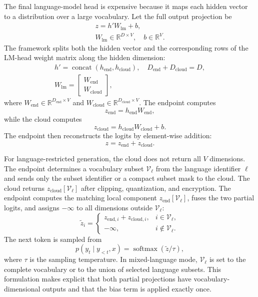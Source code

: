 \documentclass{article}
\newcommand{\End}{\mathrm{end}}
\newcommand{\Cloud}{\mathrm{cloud}}
\newcommand{\softmax}{\operatorname{softmax}}
\newcommand{\concat}{\operatorname{concat}}
\begin{document}
The final language-model head is expensive because it maps each hidden vector to a distribution over a large vocabulary. Let the full output projection be
\begin{equation}
\begin{gathered}
  z = h' W_{\mathrm{lm}} + b, \\
  W_{\mathrm{lm}} \in \mathbb{R}^{D \times V},\quad b \in \mathbb{R}^{V}.
\end{gathered}
\end{equation}
The framework splits both the hidden vector and the corresponding rows of the LM-head weight matrix along the hidden dimension:
\begin{equation}
\begin{gathered}
  h' = \concat(h_{\End}, h_{\Cloud}),\quad D_{\End}+D_{\Cloud}=D, \\
  W_{\mathrm{lm}} =
  \begin{bmatrix}
    W_{\End} \\
    W_{\Cloud}
  \end{bmatrix},
\end{gathered}
\end{equation}
where $W_{\End}\in\mathbb{R}^{D_{\End}\times V}$ and $W_{\Cloud}\in\mathbb{R}^{D_{\Cloud}\times V}$. The endpoint computes
\begin{equation}
  z_{\End}=h_{\End} W_{\End},
\end{equation}
while the cloud computes
\begin{equation}
  z_{\Cloud}=h_{\Cloud} W_{\Cloud} + b.
\end{equation}
The endpoint then reconstructs the logits by element-wise addition:
\begin{equation}
  z=z_{\End}+z_{\Cloud}.
\end{equation}

For language-restricted generation, the cloud does not return all $V$ dimensions. The endpoint determines a vocabulary subset $\mathcal{V}_{\ell}$ from the language identifier $\ell$ and sends only the subset identifier or a compact subset mask to the cloud. The cloud returns $z_{\Cloud}[\mathcal{V}_{\ell}]$ after clipping, quantization, and encryption. The endpoint computes the matching local component $z_{\End}[\mathcal{V}_{\ell}]$, fuses the two partial logits, and assigns $-\infty$ to all dimensions outside $\mathcal{V}_{\ell}$:
\begin{equation}
  \tilde{z}_i =
  \begin{cases}
    z_{\End,i}+z_{\Cloud,i}, & i \in \mathcal{V}_{\ell},\\
    -\infty, & i \notin \mathcal{V}_{\ell}.
  \end{cases}
\end{equation}
The next token is sampled from
\begin{equation}
  p(y_t\mid y_{<t},x)=\softmax(\tilde{z}/\tau),
\end{equation}
where $\tau$ is the sampling temperature. In mixed-language mode, $\mathcal{V}_{\ell}$ is set to the complete vocabulary or to the union of selected language subsets. This formulation makes explicit that both partial projections have vocabulary-dimensional outputs and that the bias term is applied exactly once.
\end{document}

